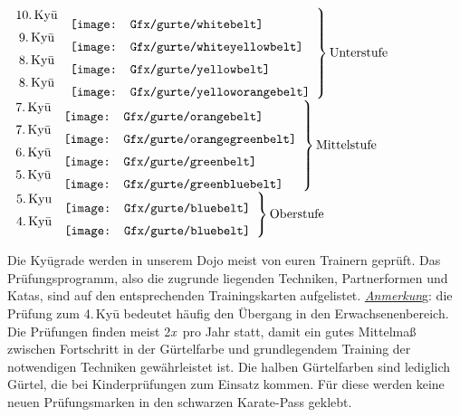 	\setlength{\tabcolsep}{3pt}
	\null\vfill\null
	\begin{center}
	\parbox{\textwidth-2\tabcolsep}{
		\begin{center}
			$\left.\begin{array}{cl} \text{10.\,Ky\={u}} & \raisebox{-7.2pt}{\texttt{[image: Gfx/gurte/whitebelt]}}\\ \text{9.\,Ky\={u}} & \raisebox{-7.2pt}{\texttt{[image: Gfx/gurte/whiteyellowbelt]}}\\ \text{8.\,Ky\={u}} & \raisebox{-7.2pt}{\texttt{[image: Gfx/gurte/yellowbelt]}}\\ \text{8.\,Ky\={u}}& \raisebox{-7.2pt}{\texttt{[image: Gfx/gurte/yelloworangebelt]}}\end{array} \right\}\text{Unterstufe}$\quad$\left.\begin{array}{cl} \text{7.\,Ky\={u}} & \raisebox{-7.2pt}{\texttt{[image: Gfx/gurte/orangebelt]}} \\ \text{7.\,Ky\={u}} & \raisebox{-7.2pt}{\texttt{[image: Gfx/gurte/orangegreenbelt]}}\\ \text{6.\,Ky\={u}} & \raisebox{-7.2pt}{\texttt{[image: Gfx/gurte/greenbelt]}}\\ \text{5.\,Ky\={u}} & \raisebox{-7.2pt}{\texttt{[image: Gfx/gurte/greenbluebelt]}}\end{array} \right\}\text{Mittelstufe}$\quad$\left.\begin{array}{cl} \text{5.\,Kyu} & \raisebox{-7.2pt}{\texttt{[image: Gfx/gurte/bluebelt]}}\\ \text{4.\,Ky\={u}} & \raisebox{-7.2pt}{\texttt{[image: Gfx/gurte/bluebelt]}} \end{array} \right\}\text{Oberstufe}$
		\end{center}
		Die Ky\={u}grade werden in unserem Dojo meist von euren Trainern geprüft. Das Prüfungsprogramm, also die zugrunde liegenden Techniken, Partnerformen und Katas, sind auf den entsprechenden Trainingskarten aufgelistet. \textit{\underline{Anmerkun}}g: die Prüfung zum 4.\,Ky\={u} bedeutet häufig den Übergang in den Erwachsenenbereich.\\

		Die Prüfungen finden meist 2\textit{x}\, pro Jahr statt, damit ein gutes Mittelmaß zwischen Fortschritt in der Gürtelfarbe und grundlegendem Training der notwendigen Techniken gewährleistet ist. Die halben Gürtelfarben sind lediglich Gürtel, die bei Kinderprüfungen zum Einsatz kommen. Für diese werden keine neuen Prüfungsmarken in den schwarzen Karate-Pass geklebt.\\}


\end{center}

